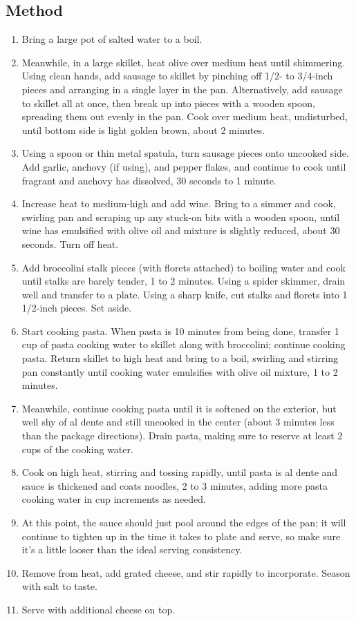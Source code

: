    \subsection{Method}
      \begin{enumerate}
        \item Bring a large pot of salted water to a boil.
        \item Meanwhile, in a large skillet, heat olive over medium heat until shimmering. Using clean hands, add sausage to skillet by pinching off 1/2- to 3/4-inch pieces and arranging in a single layer in the pan. Alternatively, add sausage to skillet all at once, then break up into pieces with a wooden spoon, spreading them out evenly in the pan. Cook over medium heat, undisturbed, until bottom side is light golden brown, about 2 minutes.
        \item Using a spoon or thin metal spatula, turn sausage pieces onto uncooked side. Add garlic, anchovy (if using), and pepper flakes, and continue to cook until fragrant and anchovy has dissolved, 30 seconds to 1 minute.
        \item Increase heat to medium-high and add wine. Bring to a simmer and cook, swirling pan and scraping up any stuck-on bits with a wooden spoon, until wine has emulsified with olive oil and mixture is slightly reduced, about 30 seconds. Turn off heat.
        \item Add broccolini stalk pieces (with florets attached) to boiling water and cook until stalks are barely tender, 1  to 2 minutes. Using a spider skimmer, drain well and transfer to a plate. Using a sharp knife, cut stalks and florets into 1 1/2-inch pieces. Set aside.
        \item Start cooking pasta. When pasta is 10 minutes from being done, transfer 1 cup of pasta cooking water to skillet along with broccolini; continue cooking pasta. Return skillet to high heat and bring to a boil, swirling and stirring pan constantly until cooking water emulsifies with olive oil mixture, 1 to 2 minutes.
        \item Meanwhile, continue cooking pasta until it is softened on the exterior, but well shy of al dente and still uncooked in the center (about 3 minutes less than the package directions). Drain pasta, making sure to reserve at least 2 cups of the cooking water.
        \item Cook on high heat, stirring and tossing rapidly, until pasta is al dente and sauce is thickened and coats noodles, 2 to 3 minutes, adding more pasta cooking water in  cup increments as needed.
        \item At this point, the sauce should just pool around the edges of the pan; it will continue to tighten up in the time it takes to plate and serve, so make sure it's a little looser than the ideal serving consistency.
        \item Remove from heat, add grated cheese, and stir rapidly to incorporate. Season with salt to taste.
        \item Serve with additional cheese on top.
      \end{enumerate}
